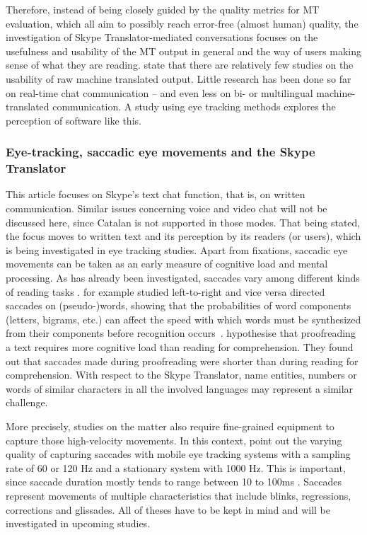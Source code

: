 \documentclass[output=paper,colorlinks,citecolor=brown]{langscibook}
\begin{document}
   Therefore, instead of being closely guided by the quality metrics for MT evaluation, which all aim to possibly reach error-free (almost human) quality, the investigation of Skype Translator-mediated conversations focuses on the usefulness and usability of the MT output in general and the way of users making sense of what they are reading. \citet[cf.][4]{doherty_assessing_2014} state that \glqq there are relatively few studies on the usability of raw machine translated output\grqq. Little research has been done so far on real-time chat communication -- and even less on bi- or multilingual machine-translated communication. A study using eye tracking methods explores the perception of software like this.
    
    
    \subsubsection{Eye-tracking, saccadic eye movements and the Skype Translator}
    \label{subsubsec:eyetracking}
    
    This article focuses on Skype's text chat function, that is, on written communication. Similar issues concerning voice and video chat will not be discussed here, since Catalan is not supported in those modes. That being stated, the focus moves to written text and its perception by its readers (or users), which is being investigated in eye tracking studies. Apart from fixations, saccadic eye movements can be taken as an early measure of cognitive load and mental processing. As has already been investigated, saccades vary among different kinds of reading tasks \citep[373]{rayner_eye_1998}. \citet{jacobson_saccadic_1979} for example studied left-to-right and vice versa directed saccades on (pseudo-)words, showing \glqq that the probabilities of word components (letters, bigrams, etc.) can affect the speed with which words must be synthesized from their components before recognition occurs\grqq~\citep[313]{jacobson_saccadic_1979}. \citet[24]{jakobsen_reading_2017} hypothesise that proofreading a text requires more cognitive load than reading for comprehension. They found out that saccades made during proofreading were shorter than during reading for comprehension. With respect to the Skype Translator, name entities, numbers or words of similar characters in all the involved languages may represent a similar challenge.
    
    More precisely, studies on the matter also require fine-grained equipment to capture those high-velocity movements. In this context, \citet{leube_sampling_2017} point out the varying quality of capturing saccades with mobile eye tracking systems with a sampling rate of 60 or 120 Hz and a stationary system with 1000 Hz. This is important, since saccade duration mostly tends to range between 10 to 100ms \citep[cf.][40]{duchowski_eye_2017}. Saccades represent movements of multiple characteristics that include blinks, regressions, corrections and glissades. All of theses have to be kept in mind and will be investigated in upcoming studies.
    
\end{document}
